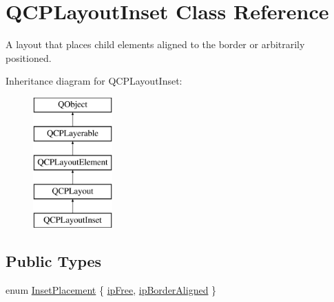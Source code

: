 \hypertarget{classQCPLayoutInset}{}\section{Q\+C\+P\+Layout\+Inset Class Reference}
\label{classQCPLayoutInset}


A layout that places child elements aligned to the border or arbitrarily positioned.  


Inheritance diagram for Q\+C\+P\+Layout\+Inset\+:\begin{figure}[H]
\begin{center}
\leavevmode
\includegraphics[height=5.000000cm]{classQCPLayoutInset}
\end{center}
\end{figure}
\subsection*{Public Types}
\begin{DoxyCompactItemize}
\item 
enum \hyperlink{classQCPLayoutInset_a8b9e17d9a2768293d2a7d72f5e298192}{Inset\+Placement} \{ \hyperlink{classQCPLayoutInset_a8b9e17d9a2768293d2a7d72f5e298192aa4802986ea2cea457f932b115acba59e}{ip\+Free}, 
\hyperlink{classQCPLayoutInset_a8b9e17d9a2768293d2a7d72f5e298192aa81e7df4a785ddee2229a8f47c46e817}{ip\+Border\+Aligned}
 \}
\end{DoxyCompactItemize}
